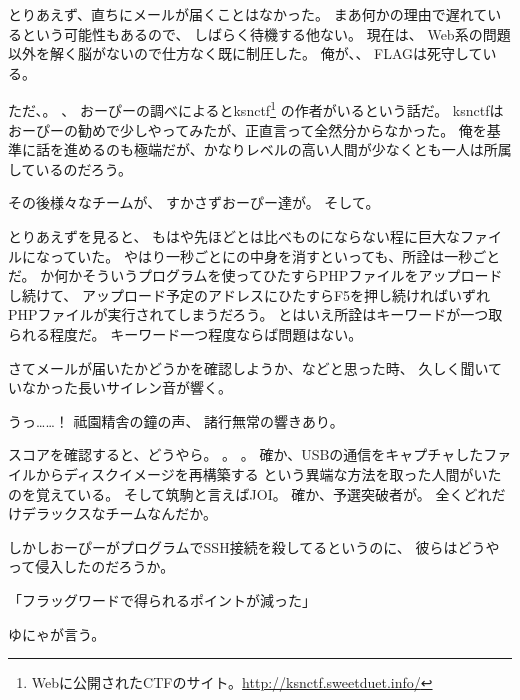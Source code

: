 とりあえず、直ちにメールが届くことはなかった。
まあ何かの理由で遅れているという可能性もあるので、
しばらく待機する他ない。
現在は、
Web系の問題以外を解く脳がないので仕方なく既に制圧した。
俺が、、
FLAGは死守している。

ただ、。
、
おーぴーの調べによるとksnctf\footnote{Webに公開されたCTFのサイト。\url{http://ksnctf.sweetduet.info/}}%
の作者がいるという話だ。
ksnctfはおーぴーの勧めで少しやってみたが、正直言って全然分からなかった。
俺を基準に話を進めるのも極端だが、かなりレベルの高い人間が少なくとも一人は所属しているのだろう。

その後様々なチームが、
すかさずおーぴー達が。
そして。

とりあえずを見ると、
もはや先ほどとは比べものにならない程に巨大なファイルになっていた。
やはり一秒ごとにの中身を消すといっても、所詮は一秒ごとだ。
か何かそういうプログラムを使ってひたすらPHPファイルをアップロードし続けて、
アップロード予定のアドレスにひたすらF5を押し続ければいずれPHPファイルが実行されてしまうだろう。
とはいえ所詮はキーワードが一つ取られる程度だ。
キーワード一つ程度ならば問題はない。

さてメールが届いたかどうかを確認しようか、などと思った時、
久しく聞いていなかった長いサイレン音が響く。

うっ……！
祗園精舎の鐘の声、
諸行無常の響きあり。

スコアを確認すると、どうやら。
。
。
確か、USBの通信をキャプチャしたファイルからディスクイメージを再構築する
という異端な方法を取った人間がいたのを覚えている。
そして筑駒と言えばJOI。
確か、予選突破者が。
全くどれだけデラックスなチームなんだか。

しかしおーぴーがプログラムでSSH接続を殺してるというのに、
彼らはどうやって侵入したのだろうか。

「フラッグワードで得られるポイントが減った」

ゆにゃが言う。

